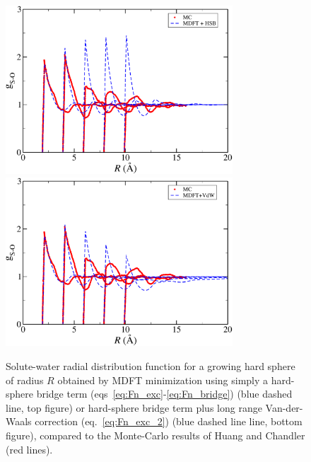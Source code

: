 \documentclass[aip,jcp,showpacs,amsmath,amssymb,superscriptaddress]{revtex4-1}
\begin{document}
\begin{figure}
    \includegraphics[width=8.5cm]{comp_MD_MDFT_ChandlerSys_HSB_SPC.pdf}\\
    \includegraphics[width=8.5cm]{comp_MD_MDFT_ChandlerSys_VdW_a12p3m0p9_SPC.pdf}
    \caption{
        \label{fig:gr_Chandler}
        Solute-water radial distribution function for a growing hard sphere of radius $R$ obtained by MDFT minimization using simply a hard-sphere bridge term (eqs~\ref{eq:Fn_exc}-\ref{eq:Fn_bridge}) (blue dashed line, top figure) or hard-sphere bridge term plus long range Van-der-Waals correction (eq.~\ref{eq:Fn_exc_2}) (blue dashed line line, bottom figure), compared to the Monte-Carlo results of Huang and Chandler\cite{huang02} (red lines).       
        }
\end{figure}
\end{document}
